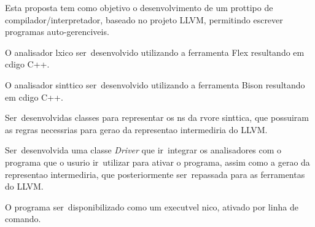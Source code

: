 








Esta proposta tem como objetivo o desenvolvimento de um prot\oh tipo de compilador/interpretador, baseado no projeto LLVM, permitindo escrever programas auto-gerenci\ah veis.

O analisador l\eh xico ser\ah\ desenvolvido utilizando a ferramenta Flex resultando em c\oh digo C++.

O analisador sint\ah tico ser\ah\ desenvolvido utilizando a ferramenta Bison resultando em c\oh digo C++.

Ser\ao\ desenvolvidas classes para representar os n\oh s da \ah rvore sint\ah tica, que possuiram as regras necess\ah rias para gera\ca o da representa\ca o intermedi\ah ria do LLVM.

Ser\ah\ desenvolvida uma classe \emph{Driver} que ir\ah\ integrar os analisadores com o programa que o usu\ah rio ir\ah\ utilizar para ativar o programa, assim como a gera\ca o da representa\ca o intermedi\ah ria, que posteriormente ser\ah\ repassada para as ferramentas do LLVM.

O programa ser\ah\ disponibilizado como um execut\ah vel \uh nico, ativado por linha de comando.
